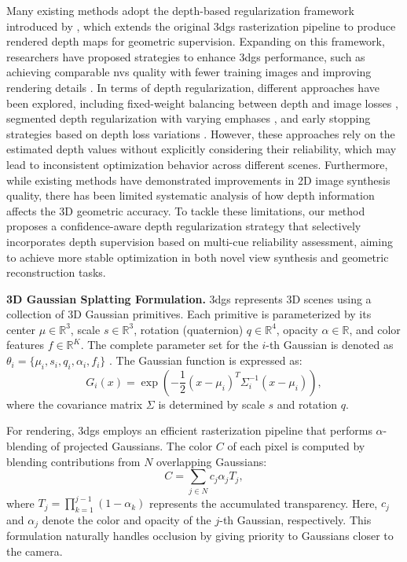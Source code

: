 \begin{sloppypar}
Many existing methods adopt the depth-based regularization framework introduced by \citet{chung2024depth}, which extends the original \gls{3dgs} rasterization pipeline to produce rendered depth maps for geometric supervision. 
Expanding on this framework, researchers have proposed strategies to enhance \gls{3dgs} performance, such as achieving comparable \gls{nvs} quality with fewer training images \citep{zhu2023fsgs} and improving rendering details \citep{li2024dngaussian}. 
In terms of depth regularization, different approaches have been explored, including fixed-weight balancing between depth and image losses \citep{liu2024endogaussian}, segmented depth regularization with varying emphases \citep{li2024dngaussian}, and early stopping strategies based on depth loss variations \citep{chung2024depth}.
However, these approaches rely on the estimated depth values without explicitly considering their reliability, which may lead to inconsistent optimization behavior across different scenes. 
Furthermore, while existing methods have demonstrated improvements in 2D image synthesis quality, there has been limited systematic analysis of how depth information affects the 3D geometric accuracy.  
To tackle these limitations, our method proposes a confidence-aware depth regularization strategy that selectively incorporates depth supervision based on multi-cue reliability assessment, aiming to achieve more stable optimization in both novel view synthesis and geometric reconstruction tasks.
\end{sloppypar}

\textbf{3D Gaussian Splatting Formulation.}
\gls{3dgs} represents 3D scenes using a collection of 3D Gaussian primitives. Each primitive is parameterized by its center \( \mu \in \mathbb{R}^3 \), scale \( s \in \mathbb{R}^3 \), rotation (quaternion) \( q \in \mathbb{R}^4 \), opacity \( \alpha \in \mathbb{R} \), and color features \( f \in \mathbb{R}^K \). The complete parameter set for the \( i \)-th Gaussian is denoted as \( \theta_i = \{ \mu_i, s_i, q_i, \alpha_i, f_i \} \) \citep{kerbl20233d}. The Gaussian function is expressed as:
\begin{equation}
G_i(x) = \exp \left(-\frac{1}{2} (x - \mu_i)^T \Sigma_i^{-1} (x - \mu_i)\right),
\end{equation}
where the covariance matrix \( \Sigma \) is determined by scale \( s \) and rotation \( q \).

For rendering, \gls{3dgs} employs an efficient rasterization pipeline that performs \(\alpha\)-blending of projected Gaussians. The color \( C \) of each pixel is computed by blending contributions from \( N \) overlapping Gaussians:
\begin{equation}
C = \sum_{j \in N} c_j \alpha_j T_j,
\end{equation}
where \( T_j = \prod_{k=1}^{j-1} (1 - \alpha_k) \) represents the accumulated transparency. Here, \( c_j \) and \( \alpha_j \) denote the color and opacity of the \( j \)-th Gaussian, respectively. This formulation naturally handles occlusion by giving priority to Gaussians closer to the camera.

